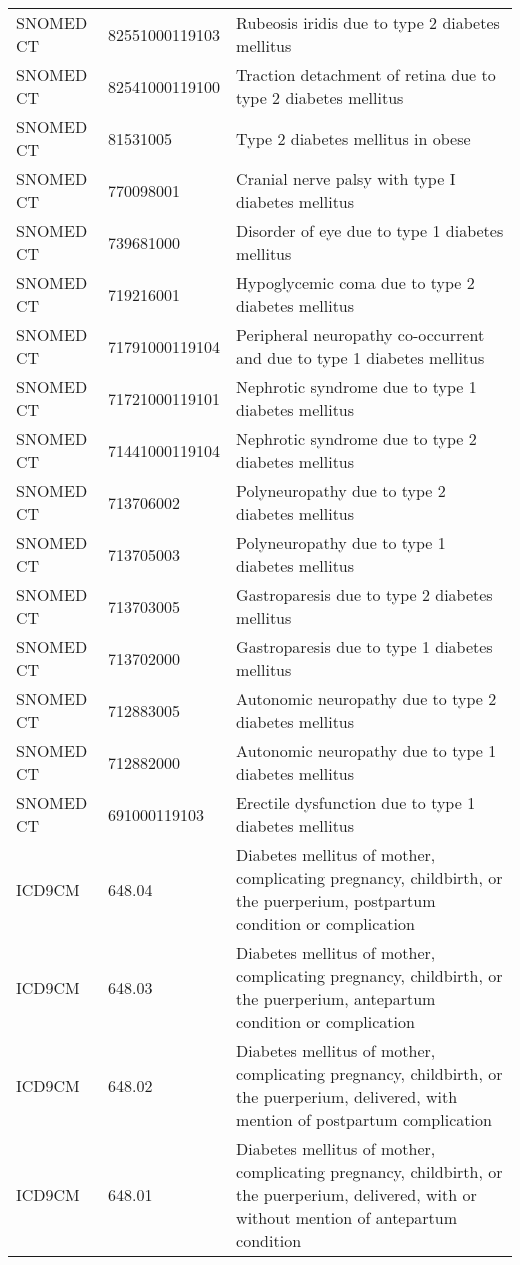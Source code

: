 \begin{table}[ht]
\begin{tabular}{lll}
  SNOMED CT & 82551000119103 & Rubeosis iridis due to type 2 diabetes mellitus \\ 
  SNOMED CT & 82541000119100 & Traction detachment of retina due to type 2 diabetes mellitus \\ 
  SNOMED CT & 81531005 & Type 2 diabetes mellitus in obese \\ 
  SNOMED CT & 770098001 & Cranial nerve palsy with type I diabetes mellitus \\ 
  SNOMED CT & 739681000 & Disorder of eye due to type 1 diabetes mellitus \\ 
  SNOMED CT & 719216001 & Hypoglycemic coma due to type 2 diabetes mellitus \\ 
  SNOMED CT & 71791000119104 & Peripheral neuropathy co-occurrent and due to type 1 diabetes mellitus \\ 
  SNOMED CT & 71721000119101 & Nephrotic syndrome due to type 1 diabetes mellitus \\ 
  SNOMED CT & 71441000119104 & Nephrotic syndrome due to type 2 diabetes mellitus \\ 
  SNOMED CT & 713706002 & Polyneuropathy due to type 2 diabetes mellitus \\ 
  SNOMED CT & 713705003 & Polyneuropathy due to type 1 diabetes mellitus \\ 
  SNOMED CT & 713703005 & Gastroparesis due to type 2 diabetes mellitus \\ 
  SNOMED CT & 713702000 & Gastroparesis due to type 1 diabetes mellitus \\ 
  SNOMED CT & 712883005 & Autonomic neuropathy due to type 2 diabetes mellitus \\ 
  SNOMED CT & 712882000 & Autonomic neuropathy due to type 1 diabetes mellitus \\ 
  SNOMED CT & 691000119103 & Erectile dysfunction due to type 1 diabetes mellitus \\ 
  ICD9CM & 648.04 & Diabetes mellitus of mother, complicating pregnancy, childbirth, or the puerperium, postpartum condition or complication \\ 
  ICD9CM & 648.03 & Diabetes mellitus of mother, complicating pregnancy, childbirth, or the puerperium, antepartum condition or complication \\ 
  ICD9CM & 648.02 & Diabetes mellitus of mother, complicating pregnancy, childbirth, or the puerperium, delivered, with mention of postpartum complication \\ 
  ICD9CM & 648.01 & Diabetes mellitus of mother, complicating pregnancy, childbirth, or the puerperium, delivered, with or without mention of antepartum condition \\ 

\end{tabular}
\end{table}
